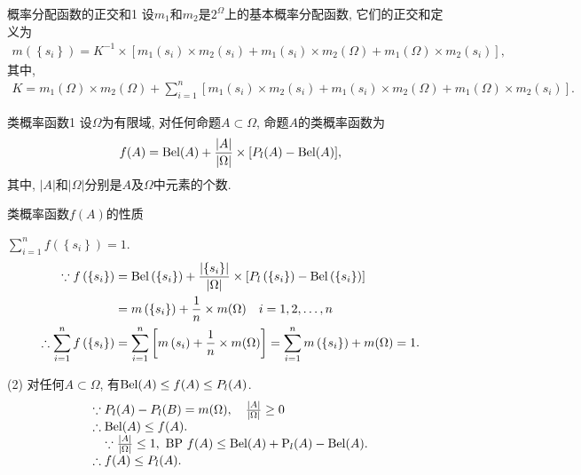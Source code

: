 \begin{mydef}{概率分配函数的正交和}{1}
设$m_1$和$m_2$是$2^\Omega$上的基本概率分配函数, 它们的正交和定义为
\begin{align}
    m\left(\left\{s_{i}\right\}\right)=K^{-1} \times\left[m_{1}\left(s_{i}\right) \times m_{2}\left(s_{i}\right)+m_{1}\left(s_{i}\right) \times m_{2}(\Omega)+m_{1}(\Omega) \times m_{2}\left(s_{i}\right)\right],
\end{align}
其中,
\begin{align}
    K=m_{1}(\Omega) \times m_{2}(\Omega)+\sum_{i=1}^{n}\left[m_{1}\left(s_{i}\right) \times m_{2}\left(s_{i}\right)+m_{1}\left(s_{i}\right) \times m_{2}(\Omega)+m_{1}(\Omega) \times m_{2}\left(s_{i}\right)\right].
\end{align}
\end{mydef}
\begin{mydef}{类概率函数}{1}
设$\Omega$为有限域, 对任何命题$A\subset \Omega$, 命题$A$的类概率函数为
\begin{align}
    f(A)=\textup{Bel}(A)+\frac{|A|}{|\Omega|} \times[P_l(A)-\textup{Bel}(A)],
\end{align}
其中, $|A|$和$|\Omega|$分别是$A$及$\Omega$中元素的个数.
\end{mydef}

类概率函数$f(A)$的性质

 $\sum_{i=1}^{n} f\left(\left\{s_{i}\right\}\right)=1$.
\begin{align*}
\because f\left(\left\{s_{i}\right\}\right) &=\textup{Bel}\left(\left\{s_{i}\right\}\right)+\frac{\left|\left\{s_{i}\right\}\right|}{|\Omega|} \times\left[P_l\left(\left\{s_{i}\right\}\right)-\textup{Bel}\left(\left\{s_{i}\right\}\right)\right] \notag\\
  &=m\left(\left\{s_{i}\right\}\right)+\frac{1}{n} \times m(\Omega) \quad i=1,2, \ldots, n \\
\therefore \sum_{i=1}^{n} f\left(\left\{s_{i}\right\}\right)
    &=\sum_{i=1}^{n}\left[m\left(s_{i}\right)+\frac{1}{n} \times m(\Omega)\right]
   =\sum_{i=1}^{n} m\left(\left\{s_{i}\right\}\right)+m(\Omega)=1.
\end{align*}

(2) 对任何$A\subset\Omega$, 有$\textup{Bel}(A)\leq f(A)\leq P_l(A)$.
\begin{align}
\begin{array}{l}
{\because P_l(A)-P_l(B)=m(\Omega), \quad \frac{|A|}{|\Omega|} \geq 0} \\
{\therefore \textup{Bel}(A) \leq f(A)}. \\
 {\quad \because \frac{|A|}{|\Omega|} \leq 1, \text { BP } f(A) \leq \textup{Bel}(A)+\textup{P}_l(A)-\textup{Bel}(A)}.\\
  \therefore f(A) \leq P_l(A).
  \end{array}
\end{align}

